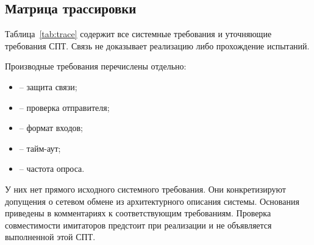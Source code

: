 \documentclass{tpks}
\begin{document}
\subsection{Матрица трассировки}
Таблица~\ref{tab:trace} содержит все системные требования и уточняющие требования СПТ. Связь не доказывает реализацию либо прохождение испытаний.

Производные требования перечислены отдельно:
\begin{itemize}
\item {} -- защита связи;
\item {} -- проверка отправителя;
\item {} -- формат входов;
\item {} -- тайм-аут;
\item {} -- частота опроса.
\end{itemize}
У них нет прямого исходного системного требования. Они конкретизируют допущения о сетевом обмене из архитектурного описания системы. Основания приведены в комментариях к соответствующим требованиям. Проверка совместимости имитаторов предстоит при реализации и не объявляется выполненной этой СПТ.
\end{document}
